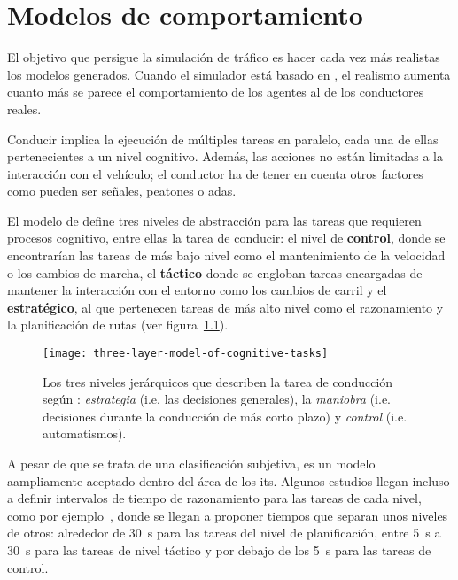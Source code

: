 \chapter{Modelos de comportamiento}
\label{ch:sota-behavior-models}

El objetivo que persigue la simulación de tráfico es hacer cada vez más realistas los modelos generados. Cuando el simulador está basado en , el realismo aumenta cuanto más se parece el comportamiento de los agentes al de los conductores reales.

Conducir implica la ejecución de múltiples tareas en paralelo, cada una de ellas pertenecientes a un nivel cognitivo. Además, las acciones no están limitadas a la interacción con el vehículo; el conductor ha de tener en cuenta otros factores como pueden ser señales, peatones o \gls{adas}.

El modelo de \cite{michon1985critical} define tres niveles de abstracción para las tareas que requieren procesos cognitivo, entre ellas la tarea de conducir: el nivel de \textbf{control}, donde se encontrarían las tareas de más bajo nivel como el mantenimiento de la velocidad o los cambios de marcha, el \textbf{táctico} donde se engloban tareas encargadas de mantener la interacción con el entorno como los cambios de carril y el \textbf{estratégico}, al que pertenecen tareas de más alto nivel como el razonamiento y la planificación de rutas (ver figura~\ref{fig:three-levels-of-human-driving}).

\begin{figure}
	\centering
	\texttt{[image: three-layer-model-of-cognitive-tasks]}
	\caption[Los tres niveles jerárquicos de la conducción]{Los tres niveles jerárquicos que describen la tarea de conducción según \cite{michon1985critical}: \textit{estrategia} (i.e. las decisiones generales), la \textit{maniobra} (i.e. decisiones durante la conducción de más corto plazo) y \textit{control} (i.e. automatismos).}
	\label{fig:three-levels-of-human-driving}
\end{figure}

A pesar de que se trata de una clasificación subjetiva, es un modelo aampliamente aceptado dentro del área de los \gls{its}. Algunos estudios llegan incluso a definir intervalos de tiempo de razonamiento para las tareas de cada nivel, como por ejemplo~\cite{Alexiadis2004}, donde se llegan a proponer tiempos que separan unos niveles de otros: alrededor de \SI{30}{\second} para las tareas del nivel de planificación, entre \SI{5}{\second} a \SI{30}{\second} para las tareas de nivel táctico y por debajo de los \SI{5}{\second} para las tareas de control.

